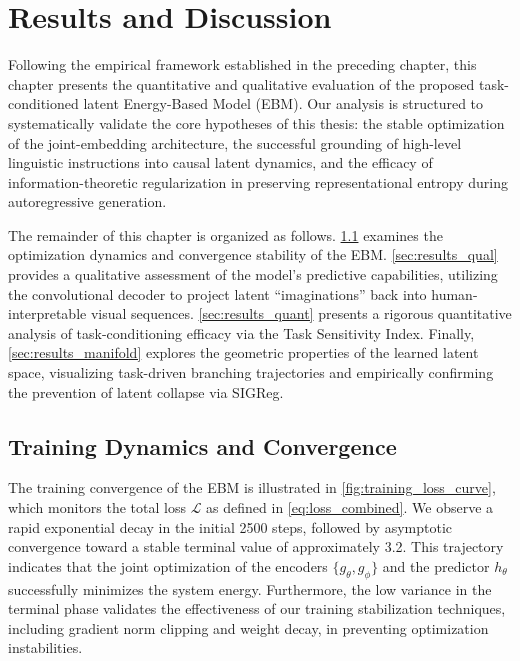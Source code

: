 \chapter{Results and Discussion}
\label{sec:results}

Following the empirical framework established in the preceding chapter, this chapter presents the quantitative and qualitative evaluation of the proposed task-conditioned latent Energy-Based Model (EBM). Our analysis is structured to systematically validate the core hypotheses of this thesis: the stable optimization of the joint-embedding architecture, the successful grounding of high-level linguistic instructions into causal latent dynamics, and the efficacy of information-theoretic regularization in preserving representational entropy during autoregressive generation.

The remainder of this chapter is organized as follows. \cref{sec:results_training} examines the optimization dynamics and convergence stability of the EBM. \cref{sec:results_qual} provides a qualitative assessment of the model's predictive capabilities, utilizing the convolutional decoder to project latent ``imaginations'' back into human-interpretable visual sequences. \cref{sec:results_quant} presents a rigorous quantitative analysis of task-conditioning efficacy via the Task Sensitivity Index. Finally, \cref{sec:results_manifold} explores the geometric properties of the learned latent space, visualizing task-driven branching trajectories and empirically confirming the prevention of latent collapse via SIGReg.

\section{Training Dynamics and Convergence}
\label{sec:results_training}

The training convergence of the EBM is illustrated in \cref{fig:training_loss_curve}, which monitors the total loss $\mathcal{L}$ as defined in \cref{eq:loss_combined}. We observe a rapid exponential decay in the initial \num{2500} steps, followed by asymptotic convergence toward a stable terminal value of approximately \num{3.2}. This trajectory indicates that the joint optimization of the encoders $\{g_\theta, g_\phi\}$ and the predictor $h_\theta$ successfully minimizes the system energy. Furthermore, the low variance in the terminal phase validates the effectiveness of our training stabilization techniques, including gradient norm clipping and weight decay, in preventing optimization instabilities.

